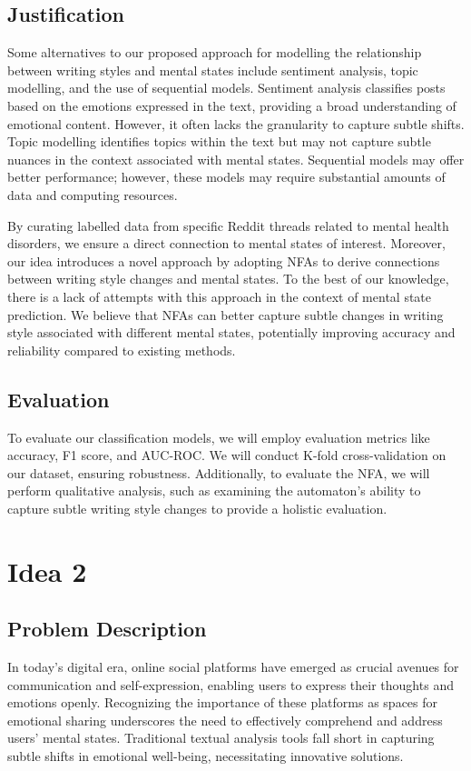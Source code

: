 \documentclass[conference,compsoc]{IEEEtran}
\begin{document}
\subsection{Justification}
Some alternatives to our proposed approach for modelling the relationship between writing styles and mental states include sentiment analysis, topic modelling, and the use of sequential models. Sentiment analysis classifies posts based on the emotions expressed in the text, providing a broad understanding of emotional content. However, it often lacks the granularity to capture subtle shifts. Topic modelling identifies topics within the text but may not capture subtle nuances in the context associated with mental states. Sequential models may offer better performance; however, these models may require substantial amounts of data and computing resources.

By curating labelled data from specific Reddit threads related to mental health disorders, we ensure a direct connection to mental states of interest. Moreover, our idea introduces a novel approach by adopting NFAs to derive connections between writing style changes and mental states. To the best of our knowledge, there is a lack of attempts with this approach in the context of mental state prediction. We believe that NFAs can better capture subtle changes in writing style associated with different mental states, potentially improving accuracy and reliability compared to existing methods. 

\subsection{Evaluation}
To evaluate our classification models, we will employ evaluation metrics like accuracy, F1 score, and AUC-ROC. We will conduct K-fold cross-validation on our dataset, ensuring robustness. Additionally, to evaluate the NFA, we will perform qualitative analysis, such as examining the automaton's ability to capture subtle writing style changes to provide a holistic evaluation.

\section{Idea 2}
\subsection{Problem Description}
In today's digital era, online social platforms have emerged as crucial avenues for communication and self-expression, enabling users to express their thoughts and emotions openly. Recognizing the importance of these platforms as spaces for emotional sharing underscores the need to effectively comprehend and address users' mental states. Traditional textual analysis tools fall short in capturing subtle shifts in emotional well-being, necessitating innovative solutions. 
\end{document}
